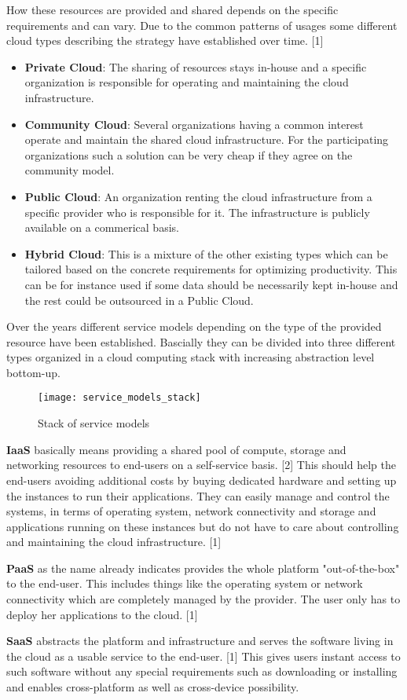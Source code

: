 How these resources are provided and shared depends on the specific requirements and can vary. Due to the common patterns of usages some different cloud types describing the strategy have established over time. [1]
\begin{itemize}
	\item \textbf{Private Cloud}: The sharing of resources stays in-house and a specific organization is responsible for operating and maintaining the cloud infrastructure.
	\item \textbf{Community Cloud}: Several organizations having a common interest operate and maintain the shared cloud infrastructure. For the participating organizations such a solution can be very cheap if they agree on the community model.
	\item \textbf{Public Cloud}: An organization renting the cloud infrastructure from a specific provider who is responsible for it. The infrastructure is publicly available on a commerical basis. 
	\item \textbf{Hybrid Cloud}: This is a mixture of the other existing types which can be tailored based on the concrete requirements for optimizing productivity. This can be for instance used if some data should be necessarily kept in-house and the rest could be outsourced in a Public Cloud.
	\end{itemize} 

Over the years different service models depending on the type of the provided resource have been established. 
Bascially they can be divided into three different types organized in a cloud computing stack with increasing abstraction level bottom-up.

\begin{figure}[h!]
	\centering
		\texttt{[image: service\_models\_stack]}
	\caption{Stack of service models}
\end{figure}

\textbf{IaaS} basically means providing a shared pool of compute, storage and networking resources to end-users on a self-service basis. [2] This should help the end-users avoiding additional costs by buying dedicated hardware and setting up the instances to run their applications. They can easily manage and control the systems, in terms of operating system, network connectivity and storage and applications running on these instances but do not have to care about controlling and maintaining the cloud infrastructure. [1]

\textbf{PaaS} as the name already indicates provides the whole platform "out-of-the-box" to the end-user. This includes things like the operating system or network connectivity which are completely managed by the provider. The user only has to deploy her applications to the cloud. [1]

\textbf{SaaS} abstracts the platform and infrastructure and serves the software living in the cloud as a usable service to the end-user. [1]  This gives users instant access to such software without any special requirements such as downloading or installing and enables cross-platform as well as cross-device possibility. 